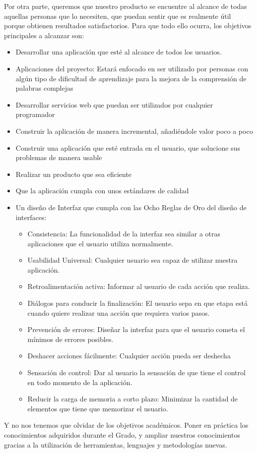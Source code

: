 Por otra parte, queremos que nuestro producto se encuentre al alcance de todas aquellas personas que lo necesiten, que puedan sentir que es realmente útil porque obtienen resultados satisfactorios. Para que todo ello ocurra, los objetivos principales a alcanzar son:
\begin{itemize}
	\item Desarrollar una aplicación que esté al alcance de todos los usuarios.	
	\item Aplicaciones del proyecto: Estará enfocado en ser utilizado por personas con algún tipo de dificultad de aprendizaje para la mejora de la comprensión de palabras complejas
	\item Desarrollar servicios web que puedan ser utilizados por cualquier programador
	\item Construir la aplicación de manera incremental, añadiéndole valor poco a poco
	\item Construir una aplicación que esté entrada en el usuario, que solucione sus problemas de manera usable
	\item Realizar un producto que sea eficiente
	\item Que la aplicación cumpla con unos estándares de calidad
	\item Un diseño de Interfaz que cumpla con las Ocho Reglas de Oro del diseño de interfaces:
	\begin{itemize} 
		\item Consistencia: La funcionalidad de la interfaz sea similar a otras aplicaciones que el usuario utiliza normalmente.
		\item Usabilidad Universal: Cualquier usuario sea capaz de utilizar nuestra aplicación.
		\item Retroalimentación activa: Informar al usuario de cada acción que realiza.
		\item Diálogos para conducir la finalización: El usuario sepa en que etapa está cuando quiere realizar una acción que requiera varios pasos.
		\item Prevención de errores: Diseñar la interfaz para que el usuario cometa el mínimos de errores posibles.
		\item Deshacer acciones fácilmente: Cualquier acción pueda ser deshecha
		\item Sensación de control: Dar al usuario la sensación de que tiene el control en todo momento de la aplicación.
		\item Reducir la carga de memoria a corto plazo: Minimizar la cantidad de elementos que tiene que memorizar el usuario.
	\end{itemize}
\end{itemize}
Y no nos tenemos que olvidar de los objetivos académicos. Poner en práctica los conocimientos adquiridos durante el Grado, y ampliar nuestros conocimientos gracias a la utilización de herramientas, lenguajes y metodologías nuevas.